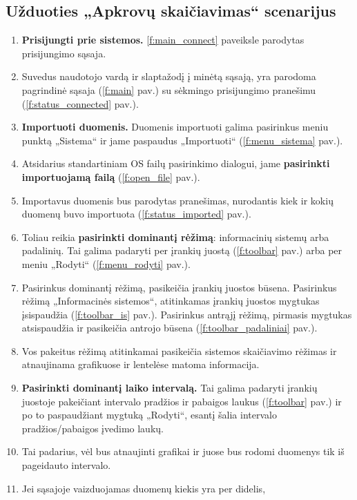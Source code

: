 \subsection{Užduoties „Apkrovų skaičiavimas“ scenarijus}

\newcommand{\ri}[1]{(\ref{#1} pav.)}

\begin{enumerate}
  \item \textbf{Prisijungti prie sistemos.} \ref{f:main_connect} paveiksle 
    parodytas prisijungimo sąsaja.
  \item Suvedus naudotojo vardą ir slaptažodį į minėtą sąsają,
    yra parodoma pagrindinė sąsaja \ri{f:main} su sėkmingo 
    prisijungimo pranešimu \ri{f:status_connected}.
  \item \textbf{Importuoti duomenis.} Duomenis importuoti galima
    pasirinkus meniu punktą „Sistema“ ir jame paspaudus
    „Importuoti“ \ri{f:menu_sistema}.
  \item Atsidarius standartiniam OS failų pasirinkimo dialogui, jame
    \textbf{pasirinkti importuojamą failą} \ri{f:open_file}.
  \item Importavus duomenis bus parodytas pranešimas, nurodantis kiek ir
    kokių duomenų buvo importuota \ri{f:status_imported}.
  \item Toliau reikia \textbf{pasirinkti dominantį rėžimą}:
    informacinių sistemų arba padalinių. Tai galima padaryti per
    įrankių juostą \ri{f:toolbar} arba per meniu „Rodyti“
    \ri{f:menu_rodyti}.
  \item Pasirinkus dominantį rėžimą, pasikeičia įrankių juostos
    būsena. Pasirinkus rėžimą „Informacinės sistemos“, atitinkamas
    įrankių juostos mygtukas įsispaudžia \ri{f:toolbar_is}. Pasirinkus
    antrąjį rėžimą, pirmasis mygtukas atsispaudžia ir pasikeičia
    antrojo būsena \ri{f:toolbar_padaliniai}.
  \item Vos pakeitus rėžimą atitinkamai pasikeičia sistemos
    skaičiavimo rėžimas ir atnaujinama grafikuose ir lentelėse matoma
    informacija.
  \item \textbf{Pasirinkti dominantį laiko intervalą.} Tai galima
    padaryti įrankių juostoje pakeičiant intervalo pradžios ir pabaigos
    laukus \ri{f:toolbar} ir po to paspaudžiant mygtuką „Rodyti“,
    esantį šalia intervalo pradžios/pabaigos įvedimo laukų.
  \item Tai padarius, vėl bus atnaujinti grafikai ir juose bus rodomi
    duomenys tik iš pageidauto intervalo.
  \item Jei sąsajoje vaizduojamas duomenų kiekis yra per didelis,

\end{enumerate}
